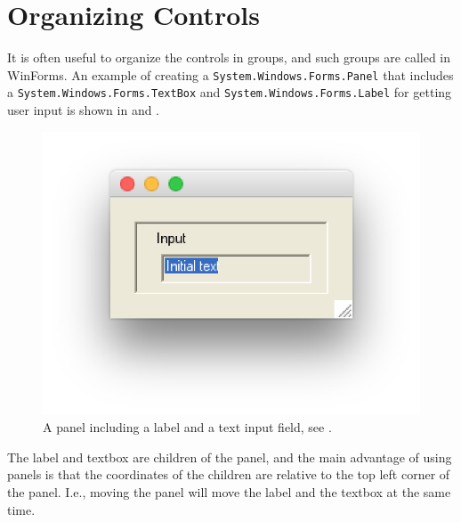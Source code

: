 \documentclass[fsharpNotes.tex]{subfiles}
\begin{document}
\section{Organizing Controls}
It is often useful to organize the controls in groups, and such groups are called  in WinForms. An example of creating a \lstinline{System.Windows.Forms.Panel} that includes a \lstinline{System.Windows.Forms.TextBox} and \lstinline{System.Windows.Forms.Label} for getting user input is shown in  and . 
%
%
\begin{figure}
  \centering
  \includegraphics[scale=0.3]{panel}
  \caption{A panel including a label and a text input field, see .}
  \label{fig:panel}
\end{figure}
The label and textbox are children of the panel, and the main advantage of using panels is that the coordinates of the children are relative to the top left corner of the panel. I.e., moving the panel will move the label and the textbox at the same time.
\end{document}
